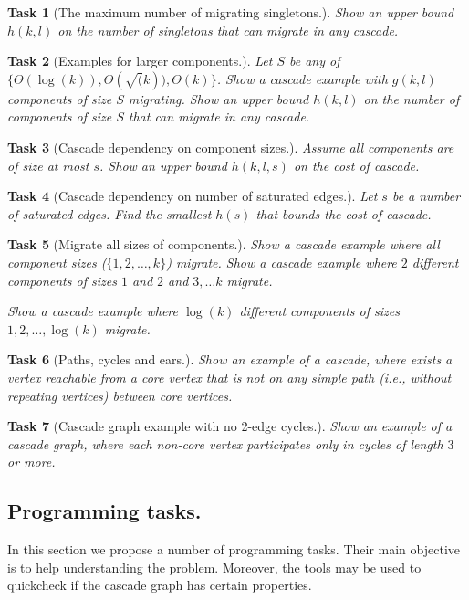 \documentclass[a4paper,USenglish]{lipics-v2019}
\newtheorem{task}{Task}
\begin{document}
\begin{task}[The maximum number of migrating singletons.]
Show an upper bound $h(k,l)$ on the number of singletons that can migrate in any cascade.
\end{task}

\begin{task}[Examples for larger components.]
Let $S$ be any of $\{ \Theta(\log(k)), \Theta(\sqrt(k)), \Theta(k)\}$.
Show a cascade example with $g(k,l)$ components of size $S$ migrating.
Show an upper bound $h(k,l)$ on the number of components of size $S$ that can migrate in any cascade.
\end{task}

\begin{task}[Cascade dependency on component sizes.]
Assume all components are of size at most $s$.
Show an upper bound $h(k,l,s)$ on the cost of cascade.
\end{task}

\begin{task}[Cascade dependency on number of saturated edges.]

Let $s$ be a number of saturated edges.
Find the smallest $h(s)$ that bounds the cost of cascade.
\end{task}

\begin{task}[Migrate all sizes of components.]

Show a cascade example where all component sizes ($\{1,2, \ldots, k\}$) migrate.
Show a cascade example where $2$ different components of sizes $1$ and $2$ and $3,\ldots k$ migrate.

Show a cascade example where $\log(k)$ different components of sizes $1, 2, \ldots, \log(k)$ migrate.
\end{task}

\begin{task}[Paths, cycles and ears.]
Show an example of a cascade, where exists a vertex reachable from a core vertex that is not on any simple path (i.e., without repeating vertices) between core vertices.
\end{task}

\begin{task}[Cascade graph example with no 2-edge cycles.]

Show an example of a cascade graph, where each non-core vertex participates only in cycles of length $3$ or more.
\end{task}

\subsection{Programming tasks.}
In this section we propose a number of programming tasks. Their main objective
is to help understanding the problem. Moreover, the tools may be used to quickcheck 
if the cascade graph has certain properties.
\end{document}
